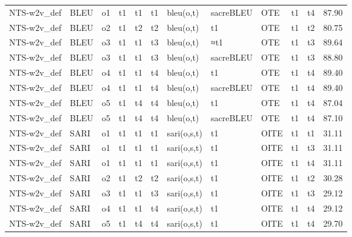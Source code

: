 \begin{tabular}{lllllllllllr}
 NTS-w2v\_def &      BLEU &     o1 &      t1 &         t1 &       t1 &    bleu(o,t) &  sacreBLEU &       OTE &       t1 &           t4 &                   87.90 \\
 NTS-w2v\_def &      BLEU &     o2 &      t1 &         t2 &       t2 &   bleu(o,t)  &         t1 &      OTE  &       t1 &           t2 &                   80.75 \\
 NTS-w2v\_def &      BLEU &     o3 &      t1 &         t1 &       t3 &   bleu(o,t)  &        ≈t1 &      OTE  &       t1 &           t3 &                   89.64 \\
 NTS-w2v\_def &      BLEU &     o3 &      t1 &         t1 &       t3 &   bleu(o,t)  &  sacreBLEU &      OTE  &       t1 &           t3 &                   88.80 \\
 NTS-w2v\_def &      BLEU &     o4 &      t1 &         t1 &       t4 &    bleu(o,t) &         t1 &       OTE &       t1 &           t4 &                   89.40 \\
 NTS-w2v\_def &      BLEU &     o4 &      t1 &         t1 &       t4 &    bleu(o,t) &  sacreBLEU &       OTE &       t1 &           t4 &                   89.40 \\
 NTS-w2v\_def &      BLEU &     o5 &      t1 &         t4 &       t4 &    bleu(o,t) &         t1 &       OTE &       t1 &           t4 &                   87.04 \\
 NTS-w2v\_def &      BLEU &     o5 &      t1 &         t4 &       t4 &    bleu(o,t) &  sacreBLEU &       OTE &       t1 &           t4 &                   87.10 \\
 NTS-w2v\_def &      SARI &     o1 &      t1 &         t1 &       t1 &  sari(o,s,t) &         t1 &      OITE &       t1 &           t1 &                   31.11 \\
 NTS-w2v\_def &      SARI &     o1 &      t1 &         t1 &       t1 &  sari(o,s,t) &         t1 &      OITE &       t1 &           t3 &                   31.11 \\
 NTS-w2v\_def &      SARI &     o1 &      t1 &         t1 &       t1 &  sari(o,s,t) &         t1 &      OITE &       t1 &           t4 &                   31.11 \\
 NTS-w2v\_def &      SARI &     o2 &      t1 &         t2 &       t2 &  sari(o,s,t) &         t1 &      OITE &       t1 &           t2 &                   30.28 \\
 NTS-w2v\_def &      SARI &     o3 &      t1 &         t1 &       t3 &  sari(o,s,t) &         t1 &      OITE &       t1 &           t3 &                   29.12 \\
 NTS-w2v\_def &      SARI &     o4 &      t1 &         t1 &       t4 &  sari(o,s,t) &         t1 &      OITE &       t1 &           t4 &                   29.12 \\
 NTS-w2v\_def &      SARI &     o5 &      t1 &         t4 &       t4 &  sari(o,s,t) &         t1 &      OITE &       t1 &           t4 &                   29.70 \\
\bottomrule
\end{tabular}
